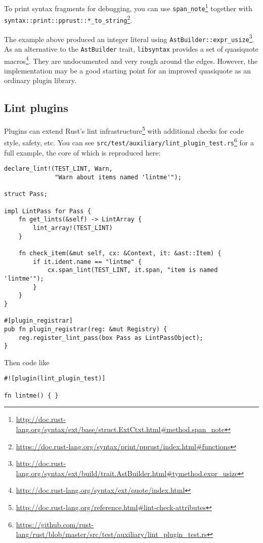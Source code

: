\documentclass[a4paper,]{book}
\renewcommand{\href}[2]{#2\footnote{\url{#1}}}
\begin{document}
To print syntax fragments for debugging, you can use
\href{http://doc.rust-lang.org/syntax/ext/base/struct.ExtCtxt.html\#method.span_note}{\texttt{span\_note}}
together with
\href{https://doc.rust-lang.org/syntax/print/pprust/index.html\#functions}{\texttt{syntax::print::pprust::*\_to\_string}}.

The example above produced an integer literal using
\href{http://doc.rust-lang.org/syntax/ext/build/trait.AstBuilder.html\#tymethod.expr_usize}{\texttt{AstBuilder::expr\_usize}}.
As an alternative to the \texttt{AstBuilder} trait, \texttt{libsyntax}
provides a set of
\href{http://doc.rust-lang.org/syntax/ext/quote/index.html}{quasiquote
macros}. They are undocumented and very rough around the edges. However,
the implementation may be a good starting point for an improved
quasiquote as an ordinary plugin library.

\subsection{Lint plugins}\label{lint-plugins}

Plugins can extend
\href{http://doc.rust-lang.org/reference.html\#lint-check-attributes}{Rust's
lint infrastructure} with additional checks for code style, safety, etc.
You can see
\href{https://github.com/rust-lang/rust/blob/master/src/test/auxiliary/lint_plugin_test.rs}{\texttt{src/test/auxiliary/lint\_plugin\_test.rs}}
for a full example, the core of which is reproduced here:

\begin{verbatim}
declare_lint!(TEST_LINT, Warn,
              "Warn about items named 'lintme'");

struct Pass;

impl LintPass for Pass {
    fn get_lints(&self) -> LintArray {
        lint_array!(TEST_LINT)
    }

    fn check_item(&mut self, cx: &Context, it: &ast::Item) {
        if it.ident.name == "lintme" {
            cx.span_lint(TEST_LINT, it.span, "item is named 'lintme'");
        }
    }
}

#[plugin_registrar]
pub fn plugin_registrar(reg: &mut Registry) {
    reg.register_lint_pass(box Pass as LintPassObject);
}
\end{verbatim}

Then code like

\begin{verbatim}
#![plugin(lint_plugin_test)]

fn lintme() { }
\end{verbatim}
\end{document}
